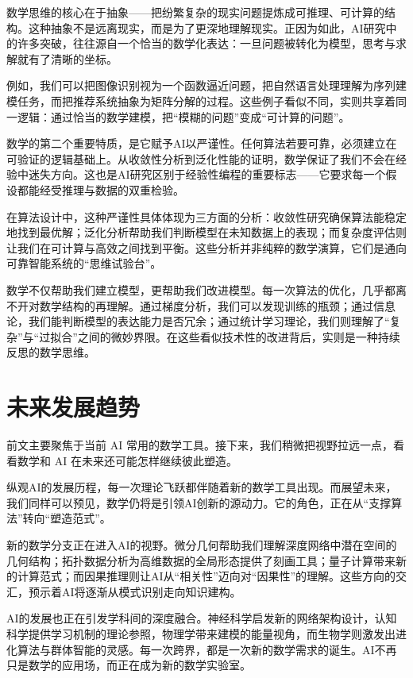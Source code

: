 数学思维的核心在于抽象——把纷繁复杂的现实问题提炼成可推理、可计算的结构。这种抽象不是远离现实，而是为了更深地理解现实。正因为如此，AI研究中的许多突破，往往源自一个恰当的数学化表达：一旦问题被转化为模型，思考与求解就有了清晰的坐标。

例如，我们可以把图像识别视为一个函数逼近问题，把自然语言处理理解为序列建模任务，而把推荐系统抽象为矩阵分解的过程。这些例子看似不同，实则共享着同一逻辑：通过恰当的数学建模，把“模糊的问题”变成“可计算的问题”。

数学的第二个重要特质，是它赋予AI以严谨性。任何算法若要可靠，必须建立在可验证的逻辑基础上。从收敛性分析到泛化性能的证明，数学保证了我们不会在经验中迷失方向。这也是AI研究区别于经验性编程的重要标志——它要求每一个假设都能经受推理与数据的双重检验。

在算法设计中，这种严谨性具体体现为三方面的分析：收敛性研究确保算法能稳定地找到最优解；泛化分析帮助我们判断模型在未知数据上的表现；而复杂度评估则让我们在可计算与高效之间找到平衡。这些分析并非纯粹的数学演算，它们是通向可靠智能系统的“思维试验台”。

数学不仅帮助我们建立模型，更帮助我们改进模型。每一次算法的优化，几乎都离不开对数学结构的再理解。通过梯度分析，我们可以发现训练的瓶颈；通过信息论，我们能判断模型的表达能力是否冗余；通过统计学习理论，我们则理解了“复杂”与“过拟合”之间的微妙界限。在这些看似技术性的改进背后，实则是一种持续反思的数学思维。

\section{未来发展趋势}

前文主要聚焦于当前 AI 常用的数学工具。接下来，我们稍微把视野拉远一点，看看数学和 AI 在未来还可能怎样继续彼此塑造。

纵观AI的发展历程，每一次理论飞跃都伴随着新的数学工具出现。而展望未来，我们同样可以预见，数学仍将是引领AI创新的源动力。它的角色，正在从“支撑算法”转向“塑造范式”。

新的数学分支正在进入AI的视野。微分几何帮助我们理解深度网络中潜在空间的几何结构；拓扑数据分析为高维数据的全局形态提供了刻画工具；量子计算带来新的计算范式；而因果推理则让AI从“相关性”迈向对“因果性”的理解。这些方向的交汇，预示着AI将逐渐从模式识别走向知识建构。

AI的发展也正在引发学科间的深度融合。神经科学启发新的网络架构设计，认知科学提供学习机制的理论参照，物理学带来建模的能量视角，而生物学则激发出进化算法与群体智能的灵感。每一次跨界，都是一次新的数学需求的诞生。AI不再只是数学的应用场，而正在成为新的数学实验室。


